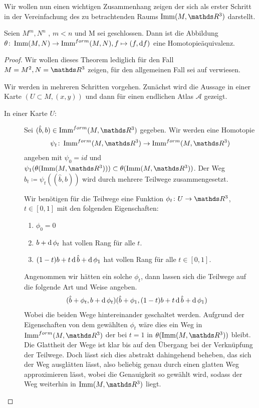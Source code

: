 Wir wollen nun einen wichtigen Zusammenhang zeigen der sich
als erster Schritt in der Vereinfachung des zu betrachtenden 
Raums $ \imm(M,\R^3) $ darstellt.
\begin{Thm}\label{smalehirsch}
	Seien $M^m,N^n$ \mfgen, $m<n$ und M sei geschlossen. Dann ist die Abbildung
	$\theta \colon \operatorname{Imm}(M,N) \rightarrow \operatorname{Imm}^{form}(M,N), f \mapsto (f,\mathrm{d} f)$ eine Homotopieäquivalenz.
	\begin{proof}
		Wir wollen dieses Theorem lediglich für den Fall $ M=M^2,N=\R^3 $
		zeigen, für den allgemeinen Fall sei auf \cite{SH} verwiesen.

		Wir werden in mehreren Schritten vorgehen. Zunächst wird die Aussage
		in einer Karte $ (U\subset M,(x,y)) $ und dann für einen 
		endlichen Atlas $ \mathcal{A} $ gezeigt.
		\begin{description}
			\item[In einer Karte $ U $:] Sei $ (\hat{b},b) \in \Immf{M}{\R^3}$ gegeben.
			Wir werden eine Homotopie 
			\begin{gather*}
			 \abb{\psi_t}{\Immf{M}{\R^3}}{\Immf{M}{\R^3}} 
			\end{gather*}
			  angeben mit $ \psi_0 = id $ und $ \psi_1(\theta(\Imm{M}{\R^3})) \subset \theta(\Imm{M}{\R^3}) $. Der Weg $ b_t \coloneqq \psi_t((\hat{b},b)) $ wird durch mehrere Teilwege zusammengesetzt.
			  
			  Wir benötigen für die Teilwege eine Funktion $ \abb{\phi_t}{U}{\R^3} $,$ t\in[0,1] $ mit den folgenden Eigenschaften:
			  \begin{enumerate}[\textbullet]
			  	\item $ \phi_0=0 $
			  	\item $b + \operatorname{d} \phi_t$ hat vollen Rang für alle $ t $.
			  	\item $ (1-t)b+t\operatorname{d} \hat{b} + \operatorname{d} \phi_1 $ hat vollen Rang für alle $ t\in[0,1] $.
			  \end{enumerate}
			  Angenommen wir hätten ein solche $ \phi_t $, dann lassen sich
			  die Teilwege auf die folgende Art und Weise angeben.
			  \begin{align*}
			  	(\hat{b} + \phi_t,b+\operatorname{d} \phi_t) & (\hat{b}+\phi_1,(1-t)b+t\operatorname{d} \hat{b} + \operatorname{d} \phi_1)
			  \end{align*}
			  Wobei die beiden Wege hintereinander geschaltet werden.
			  Aufgrund der Eigenschaften von dem gewählten $ \phi_t $ wäre dies
			  ein Weg in $ \Immf{M}{\R^3} $ der bei $ t=1 $ in $ \theta(\Imm{M}{\R^3}) $ bleibt. Die Glattheit der Wege ist klar
			  bis auf den Übergang bei der Verknüpfung der Teilwege. Doch lässt
			  sich dies abstrakt dahingehend beheben, das sich der Weg ausglätten
			  lässt, also beliebig genau durch einen glatten Weg approximieren 
			  lässt, wobei die Genauigkeit so gewählt wird, sodass der Weg
			  weiterhin in $ \Imm{M}{\R^3} $ liegt.
			  

\end{description}
\end{proof}
\end{Thm}
